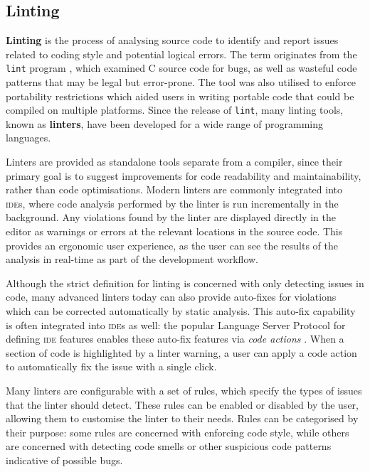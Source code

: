 \subsection{Linting}
\textbf{Linting} is the process of analysing source code to identify and report issues related to coding style and potential logical errors.
The term originates from the \texttt{lint} program \cite{johnson_lint_1978}, which examined C source code for bugs, as well as wasteful code patterns that may be legal but error-prone.
The tool was also utilised to enforce portability restrictions which aided users in writing portable code that could be compiled on multiple platforms.
Since the release of \texttt{lint}, many linting tools, known as \textbf{linters}, have been developed for a wide range of programming languages.

Linters are provided as standalone tools separate from a compiler, since their primary goal is to suggest improvements for code readability and maintainability, rather than code optimisations.
Modern linters are commonly integrated into \textsc{ide}s, where code analysis performed by the linter is run incrementally in the background.
Any violations found by the linter are displayed directly in the editor as warnings or errors at the relevant locations in the source code.
This provides an ergonomic user experience, as the user can see the results of the analysis in real-time as part of the development workflow.

Although the strict definition for linting is concerned with only detecting issues in code, many advanced linters today can also provide auto-fixes for violations which can be corrected automatically by static analysis.
This auto-fix capability is often integrated into \textsc{ide}s as well: the popular Language Server Protocol for defining \textsc{ide} features enables these auto-fix features via \textit{code actions} \cite{gunasinghe_lsp_2022}.
When a section of code is highlighted by a linter warning, a user can apply a code action to automatically fix the issue with a single click.

Many linters are configurable with a set of rules, which specify the types of issues that the linter should detect.
These rules can be enabled or disabled by the user, allowing them to customise the linter to their needs.
Rules can be categorised by their purpose: some rules are concerned with enforcing code style, while others are concerned with detecting code smells or other suspicious code patterns indicative of possible bugs.

